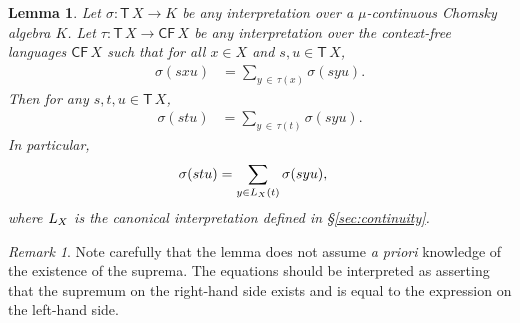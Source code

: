 \documentclass[copyright,creativecommons]{eptcs}
\newtheorem{lemma}[theorem]{Lemma}
\theoremstyle{remark}
\newtheorem{remark}{Remark}
\newcommand\fun{\mathrel\rightarrow}
\newcommand\mathname[1]{\ensuremath{\mathsf{#1}}}
\newcommand\CFname{\mathname{CF}}
\newcommand\CF[1]{\CFname\,#1}
\newcommand\Tname{\mathname{T}}
\newcommand\T[1]{\Tname\,#1}
\begin{document}
\begin{lemma}
\label{lem:cflsupr}
Let $\sigma:\T X\fun K$ be any interpretation over a $\mu$-continuous Chomsky algebra $K$.
Let $\tau:\T X\fun\CF X$ be any interpretation over the context-free languages $\CF X$ such that for all $x\in X$ and $s,u\in\T X$,
\begin{align*}
\sigma(sxu) &= \sum_{y\,\in\,\tau(x)} \sigma(syu).
\end{align*}
Then for any $s,t,u\in\T X$,
\begin{align*}
\sigma(stu) &= \sum_{y\,\in\,\tau(t)} \sigma(syu).
\end{align*}
In particular,
\begin{align}
\sigma(stu) &= \sum_{y\in L_{X}(t)} \sigma(syu),\label{eq:cflsuprL}
\end{align}
where $L_{X}$ is the canonical interpretation defined in \S\ref{sec:continuity}.
\end{lemma}
\begin{remark}
Note carefully that the lemma does not assume \emph{a priori} knowledge of the existence of the suprema. The equations should be interpreted as asserting that the supremum on the right-hand side exists and is equal to the expression on the left-hand side.
\end{remark}
\end{document}
